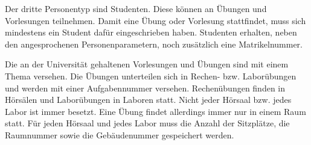         Der dritte Personentyp sind Studenten. Diese k\"onnen an \"Ubungen und
        Vorlesungen teilnehmen. Damit eine \"Ubung oder Vorlesung stattfindet,
        muss sich mindestens ein Student daf\"ur eingeschrieben haben. Studenten
        erhalten, neben den angesprochenen Personenparametern, noch zus\"atzlich
        eine Matrikelnummer.

        Die an der Universit\"at gehaltenen Vorlesungen und \"Ubungen sind mit
        einem Thema versehen. Die \"Ubungen unterteilen sich in Rechen- bzw.
        Labor\"ubungen und werden mit einer Aufgabennummer versehen.
        Rechen\"ubungen finden in H\"ors\"alen und Labor\"ubungen in Laboren
        statt. Nicht jeder H\"orsaal bzw. jedes Labor ist immer besetzt. Eine
        \"Ubung findet allerdings immer nur in einem Raum statt. F\"ur jeden
        H\"orsaal und jedes Labor muss die Anzahl der Sitzpl\"atze, die
        Raumnummer sowie die Geb\"audenummer gespeichert werden.
\clearpage